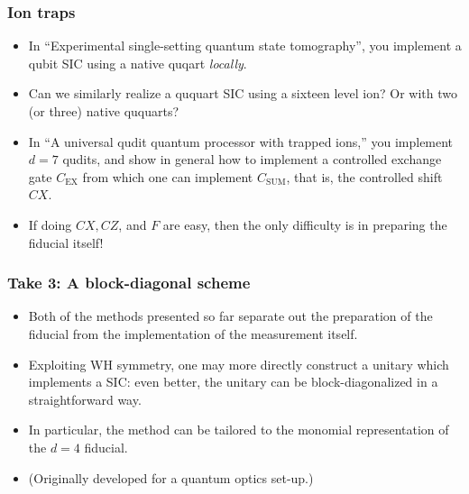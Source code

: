 \documentclass{beamer}
\begin{document}
\begin{frame}
\frametitle{Ion traps}
\begin{itemize}
\item In ``Experimental single-setting quantum state tomography'', you implement a qubit SIC using a native quqart \emph{locally}.
\item Can we similarly realize a ququart SIC using a sixteen level ion? Or with two (or three) native ququarts? 
\item In ``A universal qudit quantum processor with trapped ions,'' you implement $d=7$ qudits, and show in general how to implement a controlled exchange gate $C_{\text{EX}}$ from which one can implement $C_{\text{SUM}}$, that is, the controlled shift $CX$.
\item If doing $CX, CZ$, and $F$ are easy, then the only difficulty is in preparing the fiducial itself!
\end{itemize}
	
\end{frame}




\begin{frame}
\frametitle{Take 3: A block-diagonal scheme}
\begin{itemize}
	\item Both of the methods presented so far separate out the preparation of the fiducial from the implementation of the measurement itself.
	\item Exploiting WH symmetry, one may more directly construct a unitary  which implements a SIC: even better, the unitary can be block-diagonalized in a straightforward way.
	\item In particular, the method can be tailored to the monomial representation of the $d=4$ fiducial.
	\item (Originally developed for a quantum optics set-up.)
\end{itemize}		
\end{frame}
\end{document}
